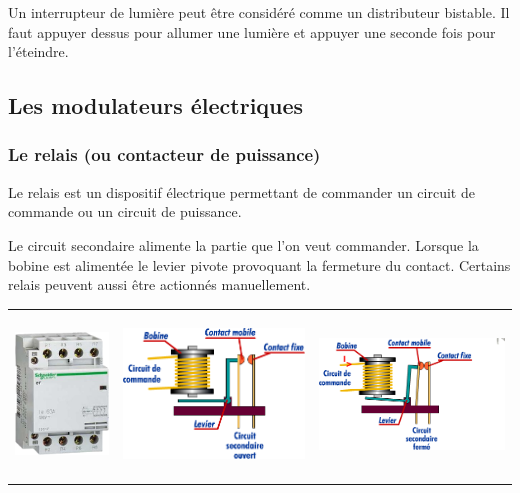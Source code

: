 \begin{exemple}
Un interrupteur de lumière peut être considéré comme un distributeur
bistable. Il faut appuyer dessus pour allumer une lumière et appuyer une
seconde fois pour l'éteindre. \\
\end{exemple}

\subsection{Les modulateurs électriques}

\subsubsection{Le relais (ou contacteur de puissance)}

Le relais est un dispositif électrique permettant de commander un circuit
de commande ou un circuit de puissance.

Le circuit secondaire alimente la partie que l'on veut commander.
Lorsque la bobine est alimentée le levier pivote provoquant la fermeture
du contact. Certains relais peuvent aussi être actionnés manuellement.

\begin{tabular}{ccc}
\includegraphics[width=1.21388in,height=1.59525in]{media/image95.png} &
\includegraphics[width=2.34736in,height=1.69567in]{media/image96.png} &
\includegraphics[width=2.4015in,height=1.7093in]{media/image97.png} \\
\end{tabular}



